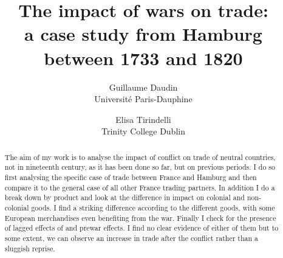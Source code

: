 \documentclass[12pt,a4paper,titlepage,english]{article}
\author{
  Guillaume Daudin \\ Université Paris-Dauphine
  \and
  Elisa Tirindelli \\ Trinity College Dublin 
}
\title{The impact of wars on trade: \\ a case study from Hamburg between 1733 and 1820}
\begin{document}
\maketitle


\begin{abstract}
The aim of my work is to analyse the impact of conflict on trade of neutral countries, not in nineteenth century, as it has been done so far, but on previous periods. I do so first analysing the specific case of trade between France and Hamburg and then compare it to the general case of all other France trading partners. In addition I do a break down by product and look at the difference in impact on colonial and non-colonial goods. I find a striking difference according to the different goods, with some European merchandises even benefiting from the war. Finally I check for the presence of lagged effects of and prewar effects. I find no clear evidence of either of them but to some extent, we can observe an increase in trade after the conflict rather than a sluggish reprise. 
\end{abstract}
\end{document}
